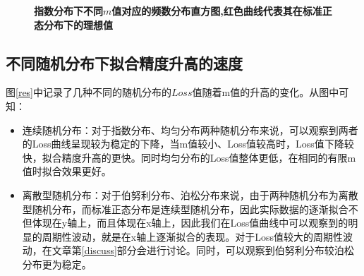 \documentclass{article}
\begin{document}
\begin{figure}[h]
    \caption{\textbf{指数分布下不同$m$值对应的频数分布直方图,红色曲线代表其在标准正态分布下的理想值}}
    \label{exp}
    \end{figure}
\subsection{不同随机分布下拟合精度升高的速度}
图\ref{res}中记录了几种不同的随机分布的$Loss$值随着m值的升高的变化。从图中可知：
\begin{itemize}
    \item 连续随机分布：对于指数分布、均匀分布两种随机分布来说，可以观察到两者的Loss曲线呈现较为稳定的下降，当m值较小、Loss值较高时，Loss值下降较快，拟合精度升高的更快。同时均匀分布的Loss值整体更低，在相同的有限m值时拟合效果更好。
    \item 离散型随机分布：对于伯努利分布、泊松分布来说，由于两种随机分布为离散型随机分布，而标准正态分布是连续型随机分布，因此实际数据的逐渐拟合不但体现在y轴上，而且体现在x轴上，因此我们在Loss值曲线中可以观察到的明显的周期性波动，就是在x轴上逐渐拟合的表现。对于Loss值较大的周期性波动，在文章第\ref{discuss}部分会进行讨论。同时，可以观察到伯努利分布较泊松分布更为稳定。
\end{itemize}
\end{document}
